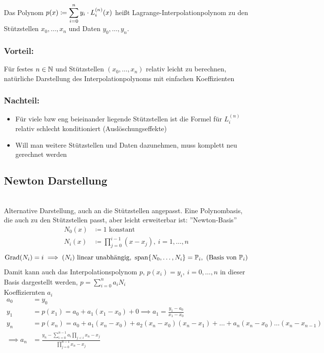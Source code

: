 \begin{definition}
    Das Polynom $p(x)\coloneqq \displaystyle\sum_{i=0}^n y_i\cdot L_i^{(n)}(x)$ heißt Lagrange-Interpolationpolynom
    zu den Stützstellen $x_0,\dots,x_n$ und Daten $y_0,\dots,y_n$.
\end{definition}
\subsubsection*{Vorteil:}
Für festes $n\in \mathbb{N}$ und Stützstellen $(x_0,\dots, x_n)$ relativ leicht zu berechnen, natürliche Darstellung des 
Interpolationpolynoms mit einfachen Koeffizienten
\subsubsection*{Nachteil:}
\begin{itemize}
    \item Für viele bzw eng beieinander liegende Stützstellen ist die Formel für $L_i^{(n)}$ relativ schlecht konditioniert 
    (Auslöschungseffekte)
    \item Will man weitere Stützstellen und Daten dazunehmen, muss komplett neu gerechnet werden
\end{itemize}
\subsection{Newton Darstellung}\hfill\\
Alternative Darstellung, auch an die Stützstellen angepasst.
Eine Polynombasis, die auch zu den Stützstellen passt, aber leicht erweiterbar ist: ''Newton-Basis''
\begin{align*}
    N_0(x) &\coloneqq 1 \text{ konstant}\\
    N_i(x) &\coloneqq \displaystyle\prod_{j=0}^{i-1}(x-x_j), \ i=1,\dots,n
\end{align*}
\[
    \text{Grad}(N_i) = i \implies (N_i) \text{ linear unabhängig},\ \text{span\ensuremath{\left\{ N_0,\dots,N_i \right\}}} = \mathbb{P}_i, \text{ (Basis von }\mathbb{P}_i)
\]
Damit kann auch das Interpolationspolynom $p$, $p(x_i)=y_i, \ i=0,\dots,n$ in dieser Basis dargestellt werden, 
$p=\sum^n_{i=0}a_iN_i$\\
Koeffiziernten $a_i$
\begin{align*}
a_0&= y_0 &&\ \\
y_1&= p(x_1) =a_0+a_1(x_1-x_0)+0 \implies a_1=\frac{y_1-a_0}{x_1-x_0} \\
y_n&= p(x_n) =a_0+a_1(x_n-x_0)+a_2(x_n-x_0)(x_n-x_1)+\dots+ a_n(x_n-x_0)\dots(x_n-x_{n-1})\\ \implies a_n&= \frac{y_n-
\sum^{n-1}_{i=0}a_i\prod_{j<i}x_n-x_j}{\prod^{n-1}_{j=0}x_n-x_j} 
\end{align*}

